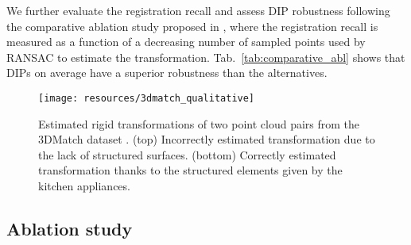 \documentclass[a4paper,conference]{IEEEtran}
\begin{document}
We further evaluate the registration recall and assess DIP robustness following the comparative ablation study proposed in \cite{Bai2020}, where the registration recall is measured as a function of a decreasing number of sampled points used by RANSAC to estimate the transformation.
Tab.~\ref{tab:comparative_abl} shows that DIPs on average have a superior robustness than the alternatives.

\begin{table}[t]
\centering
    \caption{Ablation study using the registration recall as a function of the number of sampled points on the 3DMatch dataset \cite{Zeng2017}.}
    \vspace{-.2cm}
    \label{tab:comparative_abl}
\end{table}


\begin{figure}[t]
  \centering
  \texttt{[image: resources/3dmatch\_qualitative]}
  \caption{Estimated rigid transformations of two point cloud pairs from the 3DMatch dataset \cite{Zeng2017}. 
  (top) Incorrectly estimated transformation due to the lack of structured surfaces. 
  (bottom) Correctly estimated transformation thanks to the structured elements given by the kitchen appliances.}
  \label{fig:3dmatch_qualitative}
\end{figure}




\subsection{Ablation study}\label{sec:comparative_abl_study}
\end{document}
